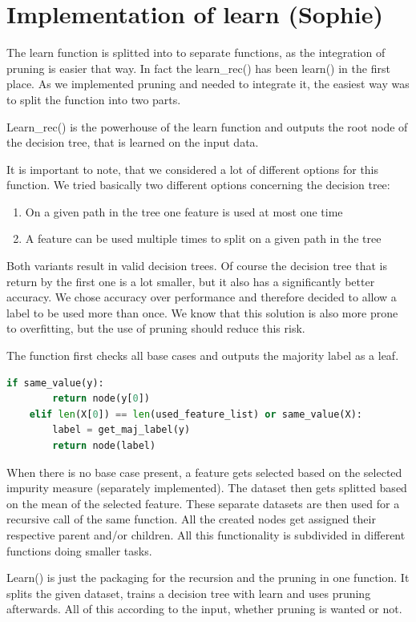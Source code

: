 \documentclass[12pt,a4paper]{scrartcl}		%
\begin{document}
\section{Implementation of learn (Sophie)}
The learn function is splitted into to separate functions, as the integration of pruning is easier that way. 
In fact the learn\_rec() has been learn() in the first place. As we implemented pruning and needed to integrate 
it, the easiest way was to split the function into two parts.

Learn\_rec() is the powerhouse of the learn function and outputs the root node of the decision tree, that is 
learned on the input data. 

It is important to note, that we considered a lot of different options for this function. We tried basically 
two different options concerning the decision tree:
\begin{enumerate}
    \item On a given path in the tree one feature is used at most one time
    \item A feature can be used multiple times to split on a given path in the tree
\end{enumerate}
Both variants result in valid decision trees. Of course the decision tree that is return by the first one is 
a lot smaller, but it also has a significantly better accuracy. We chose accuracy over performance and 
therefore decided to allow a label to be used more than once. We know that this solution is also more prone 
to overfitting, but the use of pruning should reduce this risk.

The function first checks all base cases and outputs the majority label as a leaf.
\begin{lstlisting}[language=Python]
    if same_value(y):
        return node(y[0])
    elif len(X[0]) == len(used_feature_list) or same_value(X):
        label = get_maj_label(y)
        return node(label)
\end{lstlisting}

When there is no base case 
present, a feature gets selected based on the selected impurity measure (separately implemented).
The dataset then gets splitted based on the mean of the selected feature. These separate datasets are then 
used for a recursive call of the same function. All the created nodes get assigned their respective parent 
and/or children.
All this functionality is subdivided in different functions doing smaller tasks.

Learn()  is just the packaging for the recursion and the pruning in one function. It splits the given dataset, 
trains a decision tree with learn and uses pruning afterwards. All of this according to the input, whether 
pruning is wanted or not.
\end{document}
